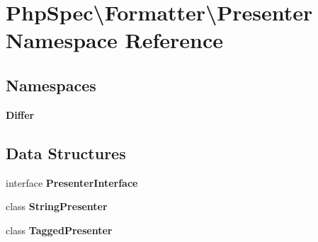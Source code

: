\section{Php\+Spec\textbackslash{}Formatter\textbackslash{}Presenter Namespace Reference}
\label{namespace_php_spec_1_1_formatter_1_1_presenter}
\subsection*{Namespaces}
\begin{DoxyCompactItemize}
\item 
 {\bf Differ}
\end{DoxyCompactItemize}
\subsection*{Data Structures}
\begin{DoxyCompactItemize}
\item 
interface {\bf Presenter\+Interface}
\item 
class {\bf String\+Presenter}
\item 
class {\bf Tagged\+Presenter}
\end{DoxyCompactItemize}
